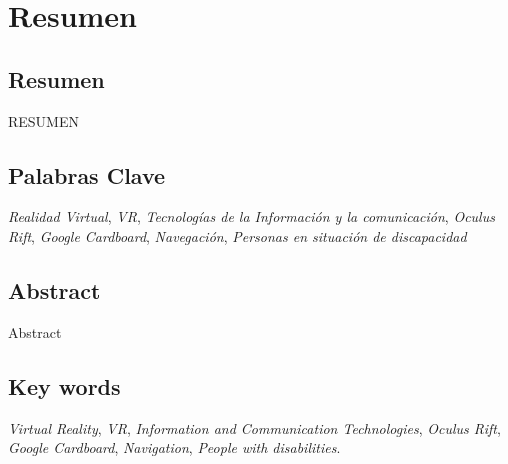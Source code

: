 \chapter*{Resumen}
\section*{Resumen}
RESUMEN
\section*{Palabras Clave}

\emph{Realidad Virtual},
\emph{VR},
\emph{Tecnolog\'ias de la Informaci\'on y la comunicaci\'on},
\emph{Oculus Rift},
\emph{Google Cardboard},
\emph{Navegaci\'on},
\emph{Personas en situaci\'on de discapacidad}
\newpage

\section*{Abstract}

Abstract 

\section*{Key words}
\emph{Virtual Reality},
\emph{VR},
\emph{Information and Communication Technologies}, 
\emph{Oculus Rift}, 
\emph{Google Cardboard}, 
\emph{Navigation}, 
\emph{People with disabilities}.